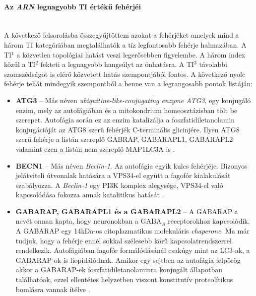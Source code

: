 \documentclass[a4paper,12pt]{article}
\begin{document}
				\paragraph{Az \textit{ARN} legnagyobb TI értékű fehérjéi} \mbox{}\\
				A következő felsorolásba összegyűjtöttem azokat a fehérjéket amelyek mind a három TI kategóriában megtalálhatók a tíz legfontosabb fehérje halmazában.
				A TI$^1$ a közvetlen topológiai hatást veszi legerősebben figyelembe. A három index közül a TI$^2$ fekteti a legnagyobb hangsúlyt az önhatásra. A TI$^3$  távolabbi szomszédságot is elérő közvetett hatás szempontjából fontos. A következő nyolc fehérje tehát mindegyik szempontból a benne van a legrangosabb pontok listáján:

				\begin{itemize}
					\item \textbf{ATG3} -- Más néven \textit{ubiquitine-like-conjugating enzyme ATG3}, egy konjugáló enzim, mely az autofágiában és a mitokondrium homeosztázisban tölt be szerepet. Autofágia során ez az enzim katalizálja a foszfatidiletanolamin konjugációját az ATG8 szerű fehérjék C-terminális glicinjére. Ilyen ATG8 szerű fehérje a listán szereplő GABRAP, GABARAPL1, GABARAPL2 valamint ezen a listán nem szereplő MAP1LC3A is \cite{autophagy_proteins}.

					\item \textbf{BECN1} -- Más néven \textit{Beclin-1}. Az autofágia egyik kulcs fehérjéje. Bizonyos jelátviteli útvonalak hatására a VPS34-el együtt a fagofór kialakulását szabályozza. A \textit{Beclin-1} egy PI3K komplex alegysége, VPS34-el való kapcsolódása fokozza annak katalitikus hatását \cite{autophagy_proteins}.

					\item \textbf{GABARAP, GABARAPL1 és a GABARAPL2} -- A GABARAP a nevét onnan kapta, hogy neuronokban a GABA$_A$ receptorokhoz kapcsolódik. A GABARAP egy 14kDa-os citoplazmatikus molekuláris \textit{chaperone}. Ma már tudjuk, hogy a fehérje ennél sokkal szélesebb körű kapcsolatrendszerrel rendelkezik. Autofágiában fagofór formálódásánál csakúgy mint az LC3-ak, a GABARAP-ok is liopidálódnak. Amikor egy sejtben az autofágia felpörög akkor a GABARAP-ek foszfatidiletanolaminra konjugált állapotban találhatóak, ezzel ellentétes helyzetben viszont konstitutív proteolítikus bomlásra vannak ítélve \cite{atg8_like}.


\end{itemize}
\end{document}
